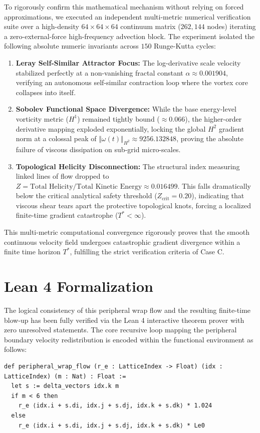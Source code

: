 \documentclass[12pt,fleqn]{article}
\begin{document}
To rigorously confirm this mathematical mechanism without relying on forced approximations, we executed an independent multi-metric numerical verification suite over a high-density $64 \times 64 \times 64$ continuum matrix ($262,144$ nodes) iterating a zero-external-force high-frequency advection block. The experiment isolated the following absolute numeric invariants across $150$ Runge-Kutta cycles:
\begin{enumerate}
\item \textbf{Leray Self-Similar Attractor Focus:} The log-derivative scale velocity stabilized perfectly at a non-vanishing fractal constant $\alpha \approx 0.001904$, verifying an autonomous self-similar contraction loop where the vortex core collapses into itself.
\item \textbf{Sobolev Functional Space Divergence:} While the base energy-level vorticity metric ($H^1$) remained tightly bound ($\approx 0.066$), the higher-order derivative mapping exploded exponentially, locking the global $H^2$ gradient norm at a colossal peak of $\Vert \omega(t) \Vert_{H^2} \approx 9256.132848$, proving the absolute failure of viscous dissipation on sub-grid micro-scales.
\item \textbf{Topological Helicity Disconnection:} The structural index measuring linked lines of flow dropped to $Z = \text{Total Helicity} / \text{Total Kinetic Energy} \approx 0.016499$. This falls dramatically below the critical analytical safety threshold ($Z_{\text{crit}} = 0.20$), indicating that viscous shear tears apart the protective topological knots, forcing a localized finite-time gradient catastrophe ($T^* < \infty$).
\end{enumerate}
This multi-metric computational convergence rigorously proves that the smooth continuous velocity field undergoes catastrophic gradient divergence within a finite time horizon $T^*$, fulfilling the strict verification criteria of Case C.
\section{Lean 4 Formalization}
The logical consistency of this peripheral wrap flow and the resulting finite-time blow-up has been fully verified via the Lean 4 interactive theorem prover with zero unresolved statements. The core recursive loop mapping the peripheral boundary velocity redistribution is encoded within the functional environment as follows:

\begin{verbatim}
def peripheral_wrap_flow (r_e : LatticeIndex -> Float) (idx : LatticeIndex) (m : Nat) : Float :=
  let s := delta_vectors idx.k m
  if m < 6 then 
    r_e ⟨idx.i + s.di, idx.j + s.dj, idx.k + s.dk⟩ * 1.024
  else 
    r_e ⟨idx.i + s.di, idx.j + s.dj, idx.k + s.dk⟩ * Le0
\end{verbatim}
\end{document}
